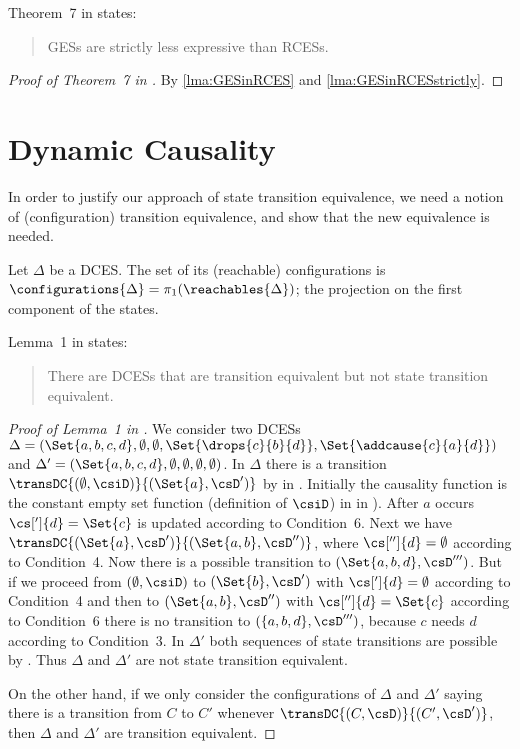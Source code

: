 \documentclass[runningheads,a4paper]{llncs}
\begin{document}
Theorem~7 in \cite{dynamicCausality15} states:
\begin{quote}
	GESs are strictly less expressive than RCESs.
\end{quote}
\begin{proof}[Proof of Theorem~7 in \cite{dynamicCausality15}]
	By \lems\ref{lma:GESinRCES} and \ref{lma:GESinRCESstrictly}.
\end{proof}
\section{Dynamic Causality}
In order to justify our approach of state transition equivalence, we need a notion of (configuration) transition equivalence, and show that the new equivalence is needed.
\begin{definition}
\label{def:DCESConfigs}
Let $\Delta$ be a DCES. The set of its (reachable) configurations is
$\configurations{\Delta}=\pi_1(\reachables{\Delta})$; the projection on the first component of the states.
\end{definition}
Lemma~1 in \cite{dynamicCausality15} states:
\begin{quote}
	There are DCESs that are transition equivalent but not state transition equivalent.
\end{quote}
\begin{proof}[Proof of Lemma~1 in \cite{dynamicCausality15}]
We consider two DCESs
	$\Delta=(\Set{a,b,c,d},\emptyset,\emptyset,\\ \Set{\drops{c}{b}{d}}, \Set{\addcause{c}{a}{d}})$ and
	$\Delta'=(\Set{a,b,c,d},\emptyset,\emptyset,\emptyset,\emptyset)$.
In $\Delta$ there is a transition $\transDC{(\emptyset,\csiD)}{(\Set{a},\csD')}$
by  in \cite{dynamicCausality15}. Initially the causality function is the
constant empty set function (\cf definition of $\csiD$) in
 in \cite{dynamicCausality15}). After $a$ occurs
$\cs[']{d}=\Set{c}$ is updated according to
 Condition~6. Next we have
$\transDC{(\Set{a},\csD')}{(\Set{a,b},\csD'')}$, where 
$\cs['']{d}=\emptyset$ according to
Condition~4. Now there is a possible transition to
$(\Set{a,b,d},\csD''')$. But if we
proceed from $(\emptyset,\csiD)$ to $(\Set{b},\csD')$ with
$\cs[']{d}=\emptyset$ according to
Condition~4 and then to $(\Set{a,b},\csD'')$ with
$\cs['']{d}=\Set{c}$ according to Condition~6 there is no transition to $(\{a,b,d\},\csD''')$, because $c$ needs $d$ according to Condition~3.
In  $\Delta'$ both sequences of state transitions are possible by . Thus $\Delta$ and $\Delta'$ are not state transition equivalent.

On the other hand, if we only consider the configurations of $\Delta$ and $\Delta'$ saying there is a transition from $C$ to $C'$ whenever $ \transDC{(C,\csD)}{(C',\csD')} $, then $\Delta$ and $\Delta'$ are transition equivalent.
\end{proof}
\end{document}
